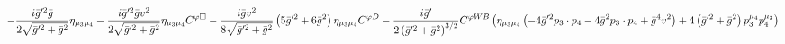 %
\begin{dmath*}
%
  -  \frac{i {\bar g}^{\prime 2} {\bar g}{}}{2 \sqrt{{\bar g}^{\prime 2} + {\bar g}{}^2}}\eta_{\mu_3 \mu_4}  -  \frac{i {\bar g}^{\prime 2} {\bar g}{} v^2}{2 \sqrt{{\bar g}^{\prime 2} + {\bar g}{}^2}}\eta_{\mu_3 \mu_4} C^{ \varphi  \Box}  -  \frac{i {\bar g}{} v^2}{8 \sqrt{{\bar g}^{\prime 2} + {\bar g}{}^2}}\left(5 {\bar g}^{\prime 2} + 6 {\bar g}{}^2\right) \eta_{\mu_3 \mu_4} C^{ \varphi  D}  -  \frac{i {\bar g}^\prime}{2 \left({\bar g}^{\prime 2} + {\bar g}{}^2\right)^{3/2}}C^{ \varphi  WB} \left(\eta_{\mu_3 \mu_4} \left( - 4 {\bar g}^{\prime 2} p_{3}\nobreak\cdot\nobreak{}p_{4} - 4 {\bar g}{}^2 p_{3}\nobreak\cdot\nobreak{}p_{4} + {\bar g}{}^4 v^2\right) + 4 \left({\bar g}^{\prime 2} + {\bar g}{}^2\right) p_3^{\mu_4} p_4^{\mu_3}\right)
%
\end{dmath*}
%
